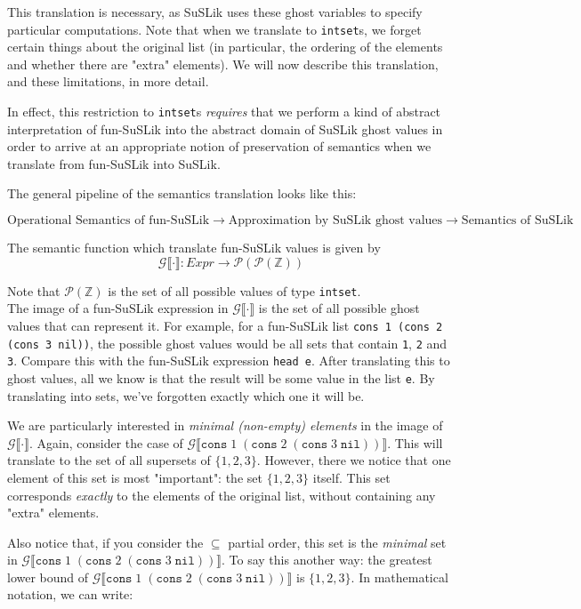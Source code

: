 \documentclass[10pt]{article}
\newcommand{\ttt}[1]{\texttt{#1}}
\newcommand{\ra}{\ensuremath{\rightarrow}}
\newcommand{\cons}{\ttt{cons}}
\newcommand{\nil}{\ttt{nil}}
\newcommand{\sem} [1] {\llbracket#1\rrbracket}
\newcommand{\Gsem} [1] {\mathcal{G}\sem{#1}}
\begin{document}
\noindent
This translation is necessary, as SuSLik uses these ghost variables to specify particular computations. Note that when we translate to
\verb|intset|s, we forget certain things about the original list (in particular, the ordering of the elements and whether there are "extra"
elements). We will now describe this translation, and these limitations, in more detail.

In effect, this restriction to \verb|intset|s \textit{requires} that we perform a kind of abstract interpretation of fun-SuSLik into the
abstract domain of SuSLik ghost values in order to arrive at an appropriate notion of preservation of semantics when we
translate from fun-SuSLik into SuSLik.


\noindent
The general pipeline of the semantics translation looks like this:

\[
  {\scriptstyle \text{Operational Semantics of fun-SuSLik} \ra \text{Approximation by SuSLik ghost values} \ra \text{Semantics of SuSLik}}
\]

\noindent
The semantic function which translate fun-SuSLik values is given by
\[
  \Gsem{\cdot} : Expr \ra \mathcal{P}(\mathcal{P}(\mathbb{Z}))
\]

\noindent
Note that $\mathcal{P}(\mathbb{Z})$ is the set of all possible values of type \verb|intset|.\\

The image of a fun-SuSLik expression in $\Gsem{\cdot}$ is the
set of all possible ghost values that can represent it. For example, for a fun-SuSLik list \verb|cons 1 (cons 2 (cons 3 nil))|, the possible
ghost values would be all sets that contain \ttt{1}, \ttt{2} and \ttt{3}. Compare this with the fun-SuSLik expression
\verb|head e|. After translating this to ghost values, all we know is that the result will be some value in the
list \verb|e|. By translating into sets, we've forgotten exactly which one it will be.

We are particularly interested in \textit{minimal (non-empty) elements} in the image of
$\Gsem{\cdot}$. Again, consider the case of $\Gsem{\cons\; 1\; (\cons\; 2\; (\cons\; 3\; \nil))}$.
This will translate to the set of all supersets of $\{1,2,3\}$. However, there we notice that one
element of this set is most "important": the set $\{1,2,3\}$ itself. This set corresponds
\textit{exactly} to the elements of the original list, without containing any
"extra" elements.

Also notice that, if you consider the $\subseteq$ partial order,
this set is the \textit{minimal} set in $\Gsem{\cons\; 1\; (\cons\; 2\; (\cons\; 3\; \nil))}$. To say this another way:
the greatest lower bound of $\Gsem{\cons\; 1\; (\cons\; 2\; (\cons\; 3\; \nil))}$ is $\{1,2,3\}$. In mathematical notation,
we can write:
\end{document}
